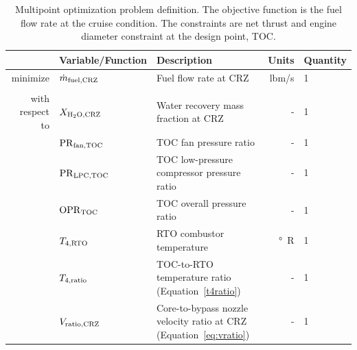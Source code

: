 \documentclass[conf]{new-aiaa}
\begin{document}
\begin{table}[hbt!]
  \centering
  \caption{
    Multipoint optimization problem definition.
    The objective function is the fuel flow rate at the cruise condition.
    The constraints are net thrust and engine diameter constraint at the design point, TOC.
  }
  \small
  \renewcommand{\arraystretch}{1.2}
  \begin{tabular}{r l l r l}
    \toprule
                    & Variable/Function              & Description                                                              & Units          & Quantity \\
    \hline
    minimize        & $\dot{m}_{\rm{fuel,CRZ}} $     & Fuel flow rate at CRZ                                                    & \si{lbm/s}     & 1        \\
                    &                                &                                                                          &                &          \\
    with respect to & $X_{\rm{H_2O,CRZ}}$            & Water recovery mass fraction at CRZ                                      & -              & 1        \\
                    & $\rm{PR}_{\rm{fan,TOC}}$       & TOC fan pressure ratio                                                   & -              & 1        \\
                    & $\rm{PR}_{\rm{LPC,TOC}}$       & TOC low-pressure compressor pressure ratio                               & -              & 1        \\
                    & $\rm{OPR}_{\rm{TOC}}$          & TOC overall pressure ratio                                               & -              & 1        \\
                    & $T_{4,\rm{RTO}}$               & RTO combustor temperature                                                & \si{\degree R} & 1        \\
                    & $T_{4,\rm{ratio}}$             & TOC-to-RTO temperature ratio (Equation~\eqref{t4ratio})                  & -              & 1        \\
                    & $V_{\rm{ratio,CRZ}}$           & Core-to-bypass nozzle velocity ratio at CRZ (Equation~\eqref{eq:vratio}) & -              & 1        \\

\end{tabular}
\end{table}
\end{document}

